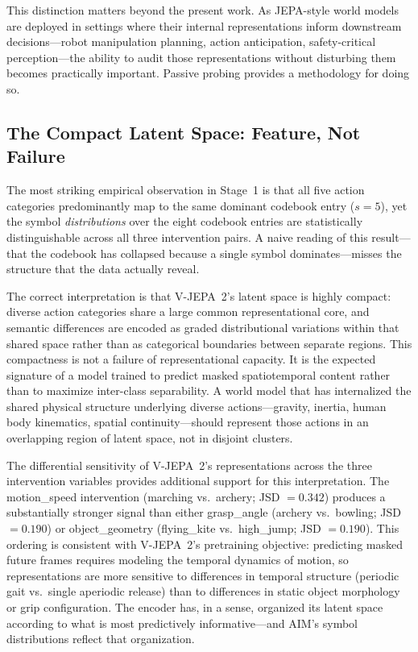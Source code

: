\documentclass{article}
\begin{document}
This distinction matters beyond the present work.
As JEPA-style world models are deployed in settings where their
internal representations inform downstream decisions---robot
manipulation planning, action anticipation, safety-critical
perception---the ability to audit those representations without
disturbing them becomes practically important.
Passive probing provides a methodology for doing so.

\subsection{The Compact Latent Space: Feature, Not Failure}

The most striking empirical observation in Stage~1 is that all five
action categories predominantly map to the same dominant codebook
entry ($s = 5$), yet the symbol \emph{distributions} over the eight
codebook entries are statistically distinguishable across all three
intervention pairs.
A naive reading of this result---that the codebook has collapsed
because a single symbol dominates---misses the structure that the
data actually reveal.

The correct interpretation is that V-JEPA~2's latent space is highly
compact: diverse action categories share a large common
representational core, and semantic differences are encoded as graded
distributional variations within that shared space rather than as
categorical boundaries between separate regions.
This compactness is not a failure of representational capacity.
It is the expected signature of a model trained to predict masked
spatiotemporal content rather than to maximize inter-class
separability.
A world model that has internalized the shared physical structure
underlying diverse actions---gravity, inertia, human body kinematics,
spatial continuity---should represent those actions in an overlapping
region of latent space, not in disjoint clusters.

The differential sensitivity of V-JEPA~2's representations across the
three intervention variables provides additional support for this
interpretation.
The motion\_speed intervention (marching vs.\ archery; JSD $= 0.342$)
produces a substantially stronger signal than either grasp\_angle
(archery vs.\ bowling; JSD $= 0.190$) or object\_geometry
(flying\_kite vs.\ high\_jump; JSD $= 0.190$).
This ordering is consistent with V-JEPA~2's pretraining objective:
predicting masked future frames requires modeling the temporal dynamics
of motion, so representations are more sensitive to differences in
temporal structure (periodic gait vs.\ single aperiodic release) than
to differences in static object morphology or grip configuration.
The encoder has, in a sense, organized its latent space according to
what is most predictively informative---and AIM's symbol distributions
reflect that organization.
\end{document}
